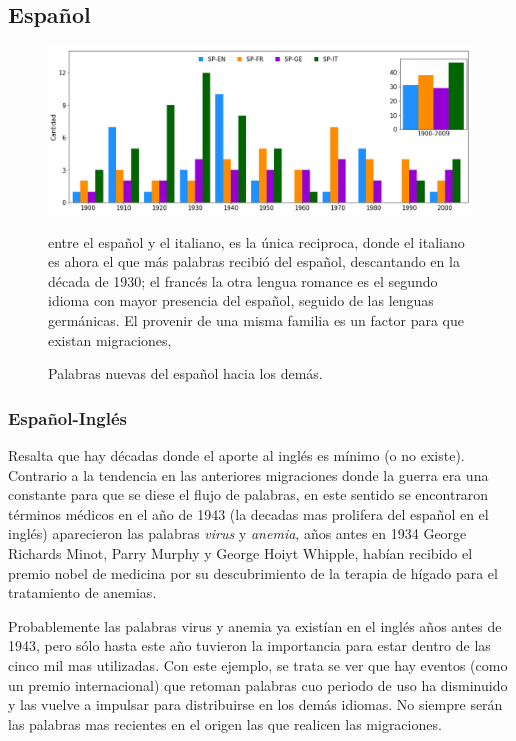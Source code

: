 \subsection{Español}%

\begin{figure}[h!]
	\centering
	\includegraphics[scale=.38]{Cap_3/NC_SP.png}
	\label{fig.NC_SP}
	\caption{Palabras nuevas del español hacia los demás.}
	\smallskip
	\small
	entre el español y el italiano, es la única reciproca, donde  el italiano es ahora el que más palabras recibió del español, descantando en la década de 1930; el francés la otra lengua romance es el segundo idioma con mayor presencia del español, seguido de las lenguas germánicas. El provenir de una misma familia es un factor para que existan migraciones,
	
\end{figure}

\subsubsection*{Español-Inglés}%

Resalta que hay décadas donde el aporte al inglés es mínimo (o no existe). Contrario a la tendencia en las anteriores migraciones donde la guerra era una constante para que se diese el flujo de palabras, en este sentido se encontraron términos médicos en el año de 1943 (la decadas mas prolifera del español en el inglés) aparecieron las palabras \textit{virus} y \textit{anemia}, años antes en 1934 George Richards Minot, Parry Murphy y George Hoiyt Whipple, habían recibido el premio nobel de medicina por su descubrimiento de la terapia de hígado para el tratamiento de anemias.   

Probablemente las palabras virus y anemia ya existían en el inglés años antes de 1943,  pero sólo hasta este año tuvieron la importancia para estar dentro de las cinco mil mas utilizadas. Con este ejemplo, se trata se ver que hay eventos (como un premio internacional) que retoman palabras cuo periodo de uso  ha disminuido y las vuelve a impulsar para distribuirse en los demás idiomas.   No siempre serán las palabras mas recientes en el origen las que realicen las migraciones. 

